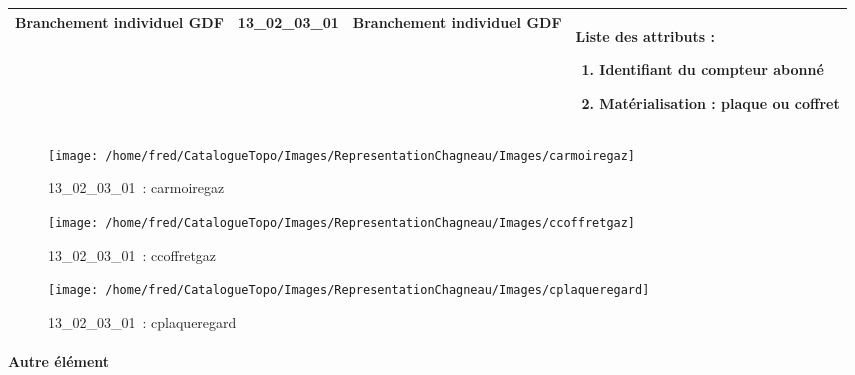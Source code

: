 \documentclass[12pt,titlepage]{book}
\begin{document}
\renewcommand{\arraystretch}{1.2}
\begin{supertabular}{|p{10cm}|c|p{13cm}|p{12cm}|}
 Branchement individuel GDF & 13\_02\_03\_01 & Branchement individuel GDF & Liste des attributs :
\begin{enumerate}
  \item Identifiant du compteur abonné  \item Matérialisation : plaque ou coffret\end{enumerate}
\\
\hline
\end{supertabular}
\begin{figure}[h!]
  \hfill         %
  \begin{minipage}[t]{3cm}
    \begin{center}
      \texttt{[image: /home/fred/CatalogueTopo/Images/RepresentationChagneau/Images/carmoiregaz]}
      \caption[~13\_02\_03\_01]{\small{13\_02\_03\_01~:} \tiny{carmoiregaz}}\label{carmoiregaz}
    \end{center}
  \end{minipage}
  \begin{minipage}[t]{3cm}
    \begin{center}
      \texttt{[image: /home/fred/CatalogueTopo/Images/RepresentationChagneau/Images/ccoffretgaz]}
      \caption[~13\_02\_03\_01]{\small{13\_02\_03\_01~:} \tiny{ccoffretgaz}}\label{ccoffretgaz}
    \end{center}
  \end{minipage}
  \begin{minipage}[t]{3cm}
    \begin{center}
      \texttt{[image: /home/fred/CatalogueTopo/Images/RepresentationChagneau/Images/cplaqueregard]}
      \caption[~13\_02\_03\_01]{\small{13\_02\_03\_01~:} \tiny{cplaqueregard}}\label{cplaqueregard}
    \end{center}
  \end{minipage}
\end{figure}


\paragraph{Autre élément}
\noindent
\vspace{\baselineskip}
\end{document}
